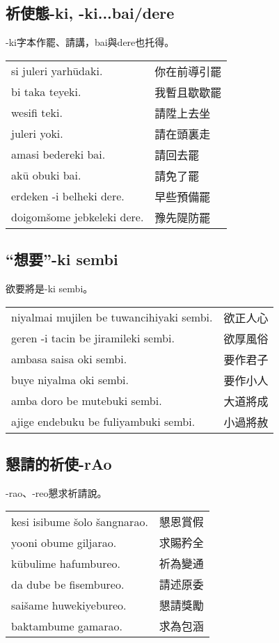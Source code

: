 \documentclass{article}
\begin{document}
\subsection{祈使態-ki, -ki...bai/dere}
\noindent -ki字本作罷、請講，bai與dere也托得。
\begin{center}
    \begin{tabularx}{\textwidth}{XX}
        si juleri yarh\={u}daki. & 你在前導引罷\\
        bi taka teyeki. & 我暫且歇歇罷\\
        wesifi teki. & 請陞上去坐\\
        juleri yoki. & 請在頭裏走\\
        amasi bedereki bai. & 請回去罷\\
        ak\={u} obuki bai. & 請免了罷\\
        erdeken -i belheki dere. & 早些預備罷\\
        doigom\v{s}ome jebkeleki dere. & 豫先隄防罷
    \end{tabularx}
\end{center}

\subsection{“想要”-ki sembi}
\noindent 欲要將是-ki sembi。
\begin{center}
    \begin{tabularx}{\textwidth}{XX}
        niyalmai mujilen be tuwancihiyaki sembi.& 欲正人心\\
        geren -i tacin be jiramileki sembi. & 欲厚風俗\\
        ambasa saisa oki sembi. & 要作君子\\
        buye niyalma oki sembi. & 要作小人\\
        amba doro be mutebuki sembi. & 大道將成\\
        ajige endebuku be fuliyambuki sembi. & 小過將赦
    \end{tabularx}
\end{center}

\subsection{懇請的祈使-rAo}
\noindent -rao、-reo懇求祈請說。
\begin{center}
    \begin{tabularx}{\textwidth}{XX}
        kesi isibume \v{s}olo \v{s}angnarao. & 懇恩賞假\\
        yooni obume giljarao. & 求賜矜全\\
        k\={u}bulime hafumbureo. & 祈為變通\\
        da dube be fisembureo. & 請述原委\\
        sai\v{s}ame huwekiyebureo. & 懇請獎勵\\
        baktambume gamarao. & 求為包涵
    \end{tabularx}
\end{center}
\end{document}
